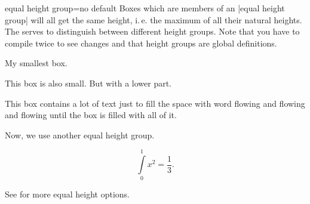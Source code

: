 \clearpage
\begin{docTcbKey}[][doc updated=2014-11-07]{equal height group}{=}{no default}
  Boxes which are members of an |equal height group| will all get the
  same height, i.\,e. the maximum of all their natural heights. The
   serves to distinguish between different height groups.
  Note that you have to compile twice to see changes and
  that height groups are global definitions.


\begin{dispExample}

\begin{tcolorbox}[equal height group=A,adjusted title={One}]
  My smallest box.
\end{tcolorbox}%
\begin{tcolorbox}[equal height group=A,adjusted title={Two}]
  This box is also small.
  \tcblower
  But with a lower part.
\end{tcolorbox}%
\begin{tcolorbox}[equal height group=A,adjusted title={Three}]
  This box contains a lot of text just to fill the space
  with word flowing and flowing and flowing until the box
  is filled with all of it.
\end{tcolorbox}\linebreak
%
%
\begin{tcolorbox}[equal height group=B]
  Now, we use another equal height group.
\end{tcolorbox}%
\begin{tcolorbox}[equal height group=B,after=]
  \begin{equation*}
    \int\limits_{0}^{1} x^2 = \frac13.
  \end{equation*}
\end{tcolorbox}
\end{dispExample}
\end{docTcbKey}

\medskip
\begin{marker}
See  for more equal height options.
\end{marker}

